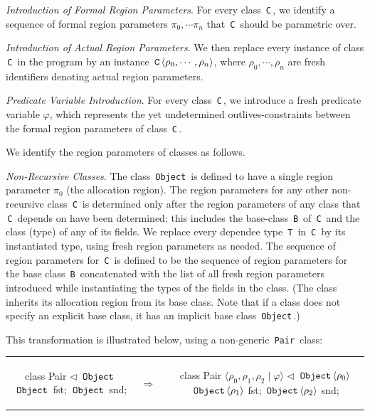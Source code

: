 \documentclass[a4paper,UKenglish]{lipics-v2018}
\newcommand{\C}[1]{\code{#1}}
\newcommand{\code}[1]{\,{\tt #1}\,}
\newcommand{\ObjZ}{\C{Object}}
\newcommand{\extends}{\triangleleft}
\begin{document}
\emph{Introduction of Formal Region Parameters}.  For every class
\C{C}, we identify a sequence of formal region parameters $\pi_0,
\cdots \pi_n$ that \C{C} should be parametric over.

\emph{Introduction of Actual Region Parameters}.  We then replace
every instance of class \C{C} in the program by an instance
$\C{C}\langle \rho_0, \cdots, \rho_n \rangle$, where $\rho_0, \cdots,
\rho_n$ are fresh identifiers denoting actual region parameters.

\emph{Predicate Variable Introduction}. For every class \C{C}, we
introduce a fresh predicate variable $\varphi$, which represents the
yet undetermined outlives-constraints between the formal region
parameters of class \C{C}.

We identify the region parameters of classes as follows.

\emph{Non-Recursive Classes}.  The class \C{Object} is defined to have
a single region parameter $\pi_0$ (the allocation region).  The region
parameters for any other non-recursive class \C{C} is determined only
after the region parameters of any class that \C{C} depends on have
been determined: this includes the base-class \C{B} of \C{C} and the
class (type) of any of its fields.  We replace every dependee type
\C{T} in \C{C} by its instantiated type, using fresh region parameters
as needed.  The sequence of region parameters for \C{C} is defined to
be the sequence of region parameters for the base class \C{B}
concatenated with the list of all  fresh region parameters introduced
while instantiating the types of the fields in the class.  (The class
inherits its allocation region from its base class. Note that if a
class does not specify an explicit base class, it has an implicit base
class \C{Object}.)

This transformation is illustrated below, using a non-generic \C{Pair} class:

\begin{tabular}{ccc}
\begin{minipage}{0.33\linewidth}
\begin{codejava}
class Pair $\extends$ $\ObjZ$ {
  $\ObjZ$ fst;
  $\ObjZ$ snd;
}
\end{codejava}
\end{minipage}
&
$\Rightarrow \; \;$
&
\begin{minipage}{0.5\linewidth}
\begin{codejava}
class Pair $\langle \rho_0, \rho_1, \rho_2 \; | \; \varphi \rangle$ $\extends$ $\ObjZ \langle \rho_0 \rangle$ {
  $\ObjZ \langle \rho_1 \rangle$ fst;
  $\ObjZ \langle \rho_2 \rangle$ snd;
}
\end{codejava}
\end{minipage}
\end{tabular}
\end{document}
